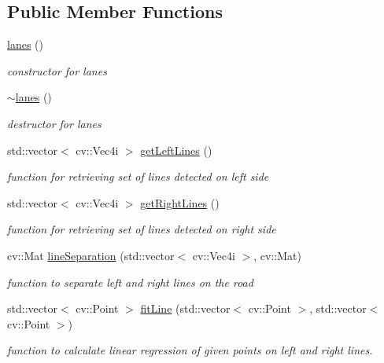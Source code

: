 \subsection*{Public Member Functions}
\begin{DoxyCompactItemize}
\item 
\hyperlink{classlanes_a81d66bf4687275c3c09d048f662b7bf4}{lanes} ()
\begin{DoxyCompactList}\small\item\em constructor for lanes \end{DoxyCompactList}\item 
\hyperlink{classlanes_a00021e14af3a9b14ff5f4b92baa18ab4}{$\sim$lanes} ()
\begin{DoxyCompactList}\small\item\em destructor for lanes \end{DoxyCompactList}\item 
std\+::vector$<$ cv\+::\+Vec4i $>$ \hyperlink{classlanes_a7ecd628c303d1e2a25db6edce7f6f3a9}{get\+Left\+Lines} ()
\begin{DoxyCompactList}\small\item\em function for retrieving set of lines detected on left side \end{DoxyCompactList}\item 
std\+::vector$<$ cv\+::\+Vec4i $>$ \hyperlink{classlanes_a8a1607edfaf2ecd2bbf308c59161200a}{get\+Right\+Lines} ()
\begin{DoxyCompactList}\small\item\em function for retrieving set of lines detected on right side \end{DoxyCompactList}\item 
cv\+::\+Mat \hyperlink{classlanes_a69b92f837457006aa91ea332ce9c24c4}{line\+Separation} (std\+::vector$<$ cv\+::\+Vec4i $>$, cv\+::\+Mat)
\begin{DoxyCompactList}\small\item\em function to separate left and right lines on the road \end{DoxyCompactList}\item 
std\+::vector$<$ cv\+::\+Point $>$ \hyperlink{classlanes_a91271ec5b3d5fcc173d640969495d3a6}{fit\+Line} (std\+::vector$<$ cv\+::\+Point $>$, std\+::vector$<$ cv\+::\+Point $>$)
\begin{DoxyCompactList}\small\item\em function to calculate linear regression of given points on left and right lines. \end{DoxyCompactList}\item 

\end{DoxyCompactItemize}

